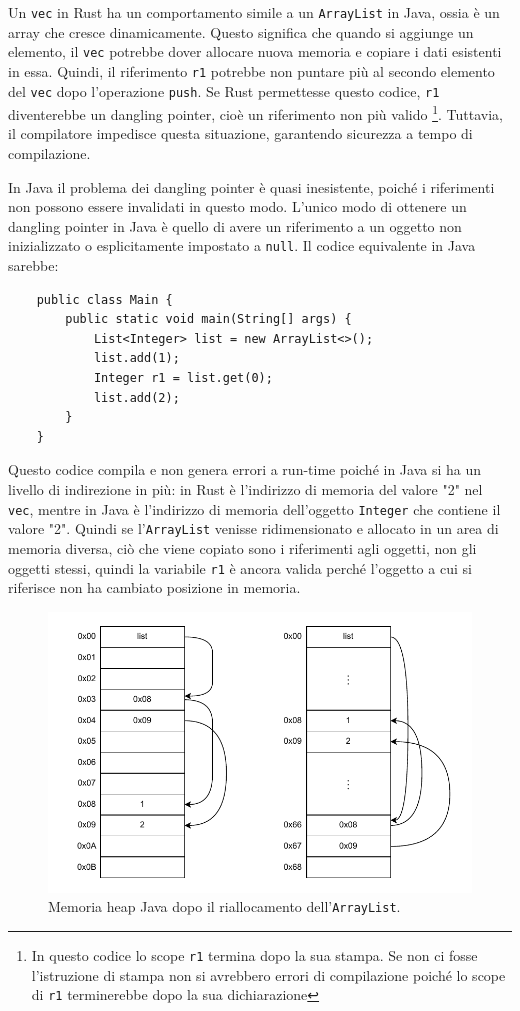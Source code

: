 Un \texttt{vec} in Rust ha un comportamento simile a un \texttt{ArrayList} in Java, ossia è un array che cresce dinamicamente. Questo significa che quando si aggiunge un elemento, il \texttt{vec} potrebbe dover allocare nuova memoria e copiare i dati esistenti in essa. Quindi, il riferimento \texttt{r1} potrebbe non puntare più al secondo elemento del \texttt{vec} dopo l'operazione \texttt{push}. Se Rust permettesse questo codice, \texttt{r1} diventerebbe un dangling pointer, cioè un riferimento non più valido
\footnote{In questo codice lo scope \texttt{r1} termina dopo la sua stampa. Se non ci fosse l'istruzione di stampa non si avrebbero errori di compilazione poiché lo scope di \texttt{r1} terminerebbe dopo la sua dichiarazione}.
 Tuttavia, il compilatore impedisce questa situazione, garantendo sicurezza a tempo di compilazione.

In Java il problema dei dangling pointer è quasi inesistente, poiché i riferimenti non possono essere invalidati in questo modo. L'unico modo di ottenere un dangling pointer in Java è quello di avere un riferimento a un oggetto non inizializzato o esplicitamente impostato a \texttt{null}. Il codice equivalente in Java sarebbe:
\begin{verbatim}
    public class Main {
        public static void main(String[] args) {
            List<Integer> list = new ArrayList<>();
            list.add(1);
            Integer r1 = list.get(0);
            list.add(2);
        }
    }
\end{verbatim}
Questo codice compila e non genera errori a run-time poiché in Java si ha un livello di indirezione in più:  in Rust è l'indirizzo di memoria del valore "2" nel \texttt{vec}, mentre in Java è l'indirizzo di memoria dell'oggetto \texttt{Integer} che contiene il valore "2". Quindi se l'\texttt{ArrayList} venisse ridimensionato e allocato in un area di memoria diversa, ciò che viene copiato sono i riferimenti agli oggetti, non gli oggetti stessi, quindi la variabile \texttt{r1} è ancora valida perché l'oggetto a cui si riferisce non ha cambiato posizione in memoria. 
\begin{figure}[H]
    \label{fig:bor3}
    \centering
    \includegraphics[width = \textwidth]{Figures/bor3.drawio.pdf}
    \caption{Memoria heap Java dopo il riallocamento dell'\texttt{ArrayList}.}
\end{figure}
